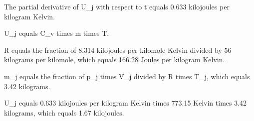 The partial derivative of U_j with respect to t equals 0.633 kilojoules per kilogram Kelvin.

U_j equals C_v times m times T.

R equals the fraction of 8.314 kilojoules per kilomole Kelvin divided by 56 kilograms per kilomole, which equals 166.28 Joules per kilogram Kelvin.

m_j equals the fraction of p_j times V_j divided by R times T_j, which equals 3.42 kilograms.

U_j equals 0.633 kilojoules per kilogram Kelvin times 773.15 Kelvin times 3.42 kilograms, which equals 1.67 kilojoules.